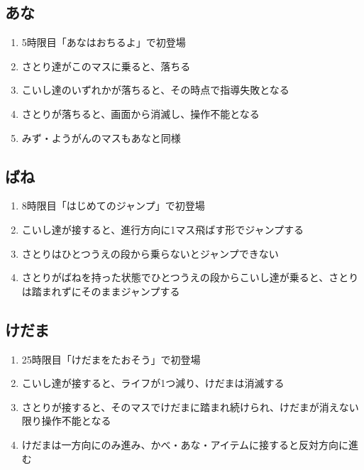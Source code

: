 \subsection{あな}
\begin{enumerate}[label={\sarrow}]
\item 5時限目「あなはおちるよ」で初登場
\item さとり達がこのマスに乗ると、落ちる
\item こいし達のいずれかが落ちると、その時点で指導失敗となる
\item さとりが落ちると、画面から消滅し、操作不能となる
\item みず・ようがんのマスもあなと同様
\end{enumerate}


\subsection{ばね}
\begin{enumerate}[label={\sarrow}]
\item 8時限目「はじめてのジャンプ」で初登場
\item こいし達が接すると、進行方向に1マス飛ばす形でジャンプする
\item さとりはひとつうえの段から乗らないとジャンプできない
\item さとりがばねを持った状態でひとつうえの段からこいし達が乗ると、さとりは踏まれずにそのままジャンプする
\end{enumerate}


\subsection{けだま}
\begin{enumerate}[label={\sarrow}]
\item 25時限目「けだまをたおそう」で初登場
\item こいし達が接すると、ライフが1つ減り、けだまは消滅する
\item さとりが接すると、そのマスでけだまに踏まれ続けられ、けだまが消えない限り操作不能となる
\item けだまは一方向にのみ進み、かべ・あな・アイテムに接すると反対方向に進む
\end{enumerate}


